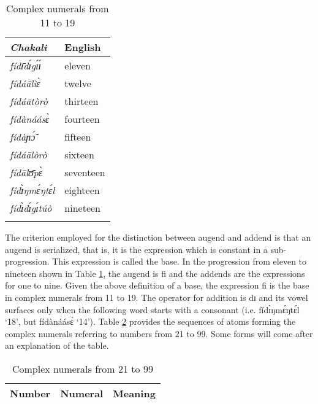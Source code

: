 \begin{exe}
\begin{exe}
\begin{exe}
\begin{exe}
\begin{exe}
\begin{exe}
\begin{exe}
\begin{exe}
\begin{exe}
\begin{exe}
  \begin{table}
  \caption{Complex numerals from 11 to 19  \label{tab:numral11-19}}
   \centering

  \begin{tabular}{>{\slshape}ll}
\lsptoprule
 {\rm Chakali} & English\\\midrule
 fídɪ̄dɪ́gɪ́ɪ́ & eleven\\
 fídáālìɛ̀ & twelve\\
  fídáātòrò &  thirteen\\
fídànáásɛ̀ &  fourteen\\
 fídàɲɔ̃́ &  fifteen\\
 fídáālòrò  & sixteen\\
fídālʊ̄pɛ̀ &  seventeen\\
  fídɪ̀ŋmɛ́ŋtɛ́l  &  eighteen\\
  fídɪ̀dɪ́gɪ́túò &  nineteen\\

\lspbottomrule
\end{tabular}
\end{table}


The criterion employed for  the distinction between augend and addend is that an augend is serialized, that is, it is the expression which is constant in a sub-progression. This expression is called the base. In the progression from eleven to nineteen shown  in  Table  \ref{tab:numral11-19},  the augend is {\sls fi} and the addends are the expressions for one to nine. Given the above definition of a base,  the expression {\sls fi} is  the base in complex numerals  from 11 to 19. The operator for addition is {\sls dɪ} and its vowel surfaces only when the following word starts with a consonant (i.e. {\sls fídɪ̀ŋmɛ́ŋtɛ́l} `18', but {\sls fídànáásɛ̀} `14'). Table \ref{tab:numeral21-99} provides the sequences of   atoms forming the complex numerals referring to  numbers from 21 to 99. Some   forms will come after an explanation of the table.


  \begin{table}
  \caption{Complex numerals from 21 to 99  \label{tab:numeral21-99}}
  \centering

  \begin{tabular}{lll}
\lsptoprule 
Number  & Numeral & Meaning\\\midrule
 

\end{tabular}
\end{table}
\end{exe}
\end{exe}
\end{exe}
\end{exe}
\end{exe}
\end{exe}
\end{exe}
\end{exe}
\end{exe}
\end{exe}
